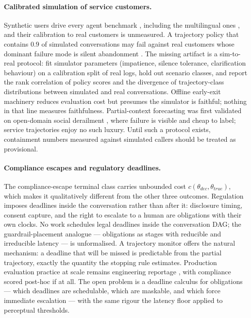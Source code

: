 \paragraph{Calibrated simulation of service customers.}
Synthetic users drive every agent benchmark \citep{sierra2024taubench}, including the multilingual ones \citep{tauvoice2026}, and their calibration to real customers is unmeasured.
A trajectory policy that contains $0.9$ of simulated conversations may fail against real customers whose dominant failure mode is silent abandonment \citep{silentabandonment2024}.
The missing artifact is a sim-to-real protocol: fit simulator parameters (impatience, silence tolerance, clarification behaviour) on a calibration split of real logs, hold out scenario classes, and report the rank correlation of policy scores and the divergence of trajectory-class distributions between simulated and real conversations.
Offline early-exit machinery \citep{earlyeval2026} reduces evaluation cost but presumes the simulator is faithful; nothing in that line measures faithfulness.
Partial-context forecasting was first validated on open-domain social derailment \citep{chang2019derailment}, where failure is visible and cheap to label; service trajectories enjoy no such luxury.
Until such a protocol exists, containment numbers measured against simulated callers should be treated as provisional.

\paragraph{Compliance escapes and regulatory deadlines.}
The compliance-escape terminal class carries unbounded cost $c(\theta_{dec}, \theta_{true})$, which makes it qualitatively different from the other three outcomes.
Regulation imposes deadlines inside the conversation rather than after it: disclosure timing, consent capture, and the right to escalate to a human are obligations with their own clocks.
No work schedules legal deadlines inside the conversation DAG; the guardrail-placement analogue --- obligations as stages with reducible and irreducible latency --- is unformalised.
A trajectory monitor offers the natural mechanism: a deadline that will be missed is predictable from the partial trajectory, exactly the quantity the stopping rule estimates.
Production evaluation practice at scale remains engineering reportage \citep{nubank2026}, with compliance scored post-hoc if at all.
The open problem is a deadline calculus for obligations --- which deadlines are schedulable, which are maskable, and which force immediate escalation --- with the same rigour the latency floor applied to perceptual thresholds.

